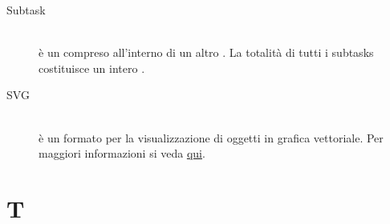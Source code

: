 \documentclass[12pt,a4paper]{article}
\begin{document}
\begin{description}
\item[Subtask] 
\hfill\\è un  compreso all'interno di un altro . La totalità di tutti i subtasks costituisce un intero .

\item[SVG] 
\hfill\\è un formato per la visualizzazione di oggetti in grafica vettoriale. Per maggiori informazioni si veda \href{https://it.wikipedia.org/wiki/Scalable_Vector_Graphics}{qui}.


\end{description}

\newpage

\section{T}
\end{document}
